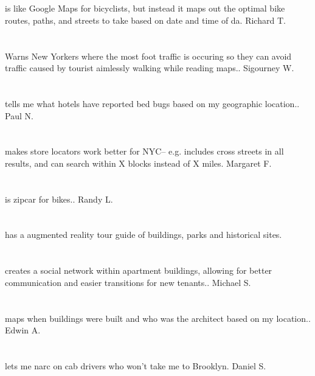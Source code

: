 \section{}is like Google Maps for bicyclists,  but instead it maps out the optimal bike routes,  paths,  and streets to take based on date and time of da. Richard T.
\section{}Warns New Yorkers where the most foot traffic is occuring so they can avoid traffic caused by tourist aimlessly walking while reading maps.. Sigourney W.
\section{}tells me what hotels have reported bed bugs based on my geographic location.. Paul N.
\section{}makes store locators work better for NYC-- e.g. includes cross streets in all results,  and can search within X blocks instead of X miles. Margaret F.
\section{}is zipcar for bikes.. Randy L.
\section{}has a augmented reality tour guide of buildings,  parks and historical sites. 
\section{}creates a social network within apartment buildings,  allowing for better communication and easier transitions for new tenants.. Michael S.
\section{} maps when buildings were built and who was the architect based on my location.. Edwin A.
\section{}lets me narc on cab drivers who won't take me to Brooklyn. Daniel S.
